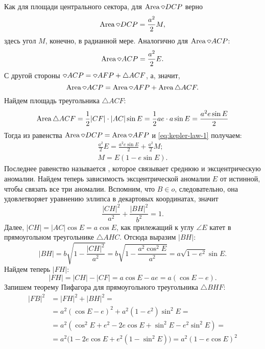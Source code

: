 Как для площади центрального сектора, для $\area \sector DCP$ верно
\begin{equation*}
	\area \sector DCP = \frac{a^2}{2} M,
\end{equation*}
здесь угол $M$, конечно, в радианной мере. Аналогично для $\area \sector ACP$:
\begin{equation*}
	\area \sector ACP = \frac{a^2}{2} E.
\end{equation*}
С другой стороны $\sector ACP = \sector AFP + \triangle ACF$, а, значит,
\begin{equation*}
	\area \sector ACP = \area\sector AFP + \area\triangle ACF.
	\label{eq:kepler-law-1}
\end{equation*}
Найдем площадь треугольника $\triangle ACF$:
\begin{equation*}
	\operatorname{Area} \triangle ACF = \frac{1}{2} |CF| \cdot |AC| \sin E = \frac{1}{2} a e \cdot a \sin E =  \frac{a^2 e\sin E}{2}
\end{equation*}
Тогда из равенства $\area \sector DCP = \area \sector AFP$ и \eqref{eq:kepler-law-1} получаем:
\begin{gather*}
	\frac{a^2}{2} E = \frac{a^2 e\sin E}{2} + \frac{a^2}{2} M;\\[0.5pc]
	M = E ( 1 - e \sin E).
\end{gather*}
Последнее равенство называется , которое связывает среднюю и эксцентрическую аномалии.
Найдем теперь зависимость эксцентрической аномалии $E$ от истинной, чтобы связать все три аномалии. Вспомним, что $B \in o$, следовательно, она удовлетворяет уравнению эллипса в декартовых координатах, значит
\begin{equation*}
	\frac{|CH|^2}{a^2} + \frac{|BH|^2}{b^2} = 1.
\end{equation*}
Далее, $|CH| = |AC| \cos E = a \cos E$, как прилежащий к углу $\angle E$ катет в прямоугольном треугольнике $\triangle AHC$. Отсюда выразим $|BH|$:
\begin{equation*}
	|BH| = b\sqrt{1 - \frac{|CH|^2}{a^2}} = b \sqrt{1 - \frac{a^2 \cos^2 E}{a^2}} = a \sqrt{1 - e^2} \sin E .
\end{equation*}
Найдем теперь $|FH|$:
\begin{equation*}
	|FH| = |CH| - |CF| = a \cos E - a e = a (\cos E - e).
\end{equation*}
Запишем теорему Пифагора для прямоугольного треугольника $\triangle BHF$:
\begin{align*}
	|FB|^2 &= |FH|^2 + |BH|^2 = \\
	&= a^2 (\cos E - e)^2 + a^2 \left( 1 - e^2 \right) \sin^2 E = \\
	&= a^2 \left( \cos^2 E + e^2 - 2 e \cos E + \sin^2 E - e^2 \sin^2 E \right) = \\
	&= a^2 \Big( 1 - 2 e \cos E + e^2 \left( 1 - \sin^2 E \right) \Big) =  a^2 \left( 1 - e \cos E \right)^2
\end{align*}
